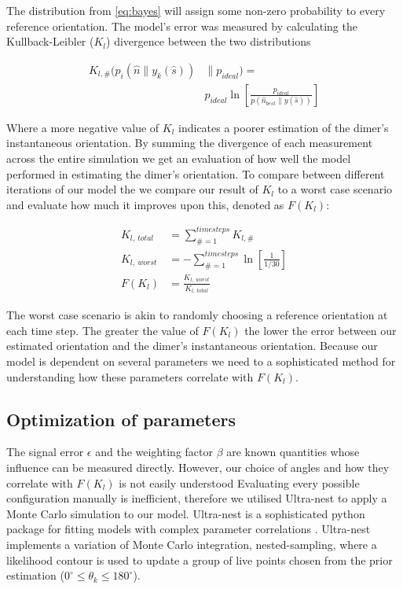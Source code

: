 \documentclass[final, 3p]{elsarticle}
\begin{document}
The distribution from \eqref{eq:bayes} will assign some non-zero probability to every reference orientation. The model's error was measured by calculating the Kullback-Leibler ($K_l$) divergence between the two distributions 

\begin{align}
	K_{l, \#}(p_i(\hat{n}\parallel y_k(\hat{s})) &\parallel p_{ideal}) =\nonumber \\
	&p_{ideal}\ln \left[\frac{p_{ideal}}{p(\hat{n}_{best}\parallel y(\hat{s}))}
	\right]
\end{align}

Where a more negative value of $K_l$ indicates a poorer estimation of the dimer's instantaneous orientation. By summing the divergence of each measurement across the entire simulation we get an evaluation of how well the model performed in estimating the dimer's orientation. To compare between different iterations of our model the we compare our result of $K_l$ to a worst case scenario and evaluate how much it improves upon this, denoted as $F(K_l)$:

\begin{align}
	K_{l, \ total} &= \sum\limits_{\# =1}^{timesteps} K_{l,\#} \\
	K_{l, \ worst} &= -\sum\limits_{\#=1}^{timesteps} \ln \left[\frac{1}{1/30} \right] \\
	F(K_l) &= \frac{K_{l,\ worst}}{K_{l, \ total}}
\end{align}

The worst case scenario is akin to randomly choosing a reference orientation at each time step. The greater the value of $F(K_l)$ the lower the error between our estimated orientation and the dimer's instantaneous orientation. Because our model is dependent on several parameters we need to a sophisticated method for understanding how these parameters correlate with $F(K_l)$.

\subsection{Optimization of parameters}
\label{sec:2.4}
The signal error $\epsilon$ and the weighting factor $\beta$ are known quantities whose influence can be measured directly. However, our choice of angles and how they correlate with $F(K_l)$ is not easily understood Evaluating every possible configuration manually is inefficient, therefore we utilised Ultra-nest to apply a Monte Carlo simulation to our model. Ultra-nest is a sophisticated python package for fitting models with complex parameter correlations \cite{Buchner2016Ultranest}. Ultra-nest implements a variation of Monte Carlo integration, nested-sampling, where a likelihood contour is used to update a group of live points chosen from the prior estimation ($0^{\circ} \leq \theta_k \leq 180^{\circ}$).
\end{document}
